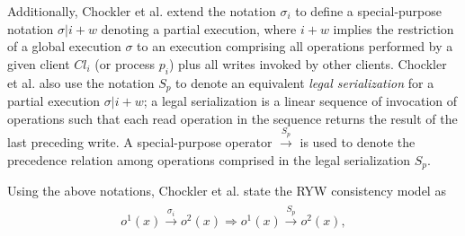\documentclass[journal,compsoc]{IEEEtran}
\begin{document}
    Additionally, Chockler et al. extend the notation $\sigma_i$ to define a special-purpose notation $\sigma |i + w$ denoting a partial
    execution, where $i + w$ implies the restriction of a global execution $\sigma$ to an execution comprising all operations performed by a given client $\mathit{Cl}_i$ (or process $p_i$) plus all writes invoked by
     other clients.  Chockler et al. also use the notation $S_p$ to denote an equivalent \emph{legal serialization} for a partial execution $\sigma |i + w$;  a legal serialization is a linear sequence of invocation of operations such that each read operation in the sequence returns the result of the last preceding write. %
      A special-purpose operator $\xrightarrow{S_p}$ is used to denote the precedence relation %
   among operations comprised in the legal serialization $S_p$.    
  \par Using the above notations, Chockler et al. state the RYW consistency model as  
  \begin{align}
  \begin{split}\label{chockler}
  \mathit{o}^1(x) \xrightarrow{\sigma_i} \mathit{o}^2(x) \Rightarrow \mathit{o}^1(x) \xrightarrow{S_p} \mathit{o}^2(x), 
  \end{split}
  \end{align} %
\end{document}
